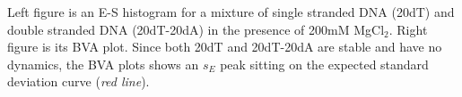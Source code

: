 \label{fig:bva_static}  Left figure is an E-S histogram for a mixture of single stranded DNA (20dT) and double stranded DNA (20dT-20dA) in the presence of 200mM MgCl$_2$. Right figure is its BVA plot. Since both 20dT and 20dT-20dA are stable and have no dynamics, the BVA plots shows an $s_E$ peak sitting on the expected standard deviation curve (\textit{red line}).
